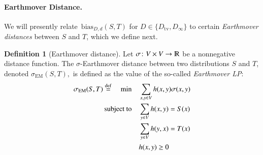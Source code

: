 \documentclass[letterpaper,11pt]{article}
\theoremstyle{definition}
\newtheorem{definition}{Definition}[section]
\renewcommand{\mathbb}{\varmathbb}
\newcommand{\defeq}{\stackrel{\small \mathrm{def}}{=}}
\newcommand{\tv}{\mathrm{tv}}
\newcommand\bias{\mathrm{bias}}
\newcommand\EM{\mathrm{EM}}
\newcommand\dtoD{D,d}
\begin{document}
\paragraph{Earthmover Distance.}
We will presently relate~$\bias_{\dtoD}(S,T)$ for $D\in\{D_\tv,D_\infty\}$
to certain \emph{Earthmover distances} between $S$ and $T$, which
we define next.

\begin{definition}[Earthmover distance]
Let $\sigma\colon V\times V\to\mathbb{R}$ be a nonnegative distance function.
The $\sigma$-Earthmover distance between two distributions
$S$ and $T$, denoted
$\sigma_{\EM}(S,T),$ is
defined as the value of the so-called \emph{Earthmover LP}:
\begin{align*}
\sigma_\EM(S,T)\defeq\quad\min\quad & \sum_{x,y\in V} h(x,y)\sigma(x,y)\\
\text{subject to}\quad
& \sum_{y\in V} h(x,y) = S(x)\\
& \sum_{y\in V} h(y,x) = T(x)\\
& h(x,y)\ge 0
\end{align*}
\end{definition}
\end{document}
